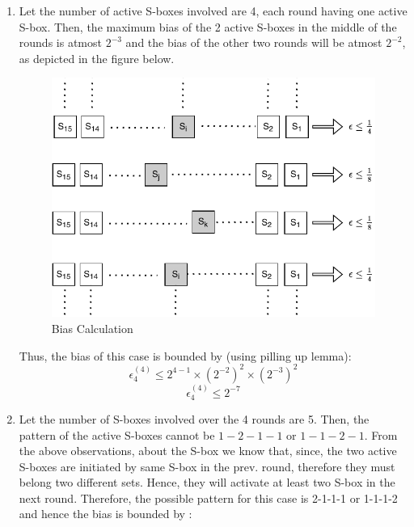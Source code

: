 \documentclass[preprint]{transcrypto}
\begin{document}
\begin{enumerate}
    \item Let the number of active S-boxes involved are 4, each round having one active S-box. Then, the maximum bias of the 2 active S-boxes in the middle of the rounds is atmost $2^{-3}$ and the bias of the other two rounds will be atmost $2^{-2}$, as depicted in the figure below.
    \begin{figure}[H]
        \centering
        \includegraphics[width=\linewidth]{LC.pdf}
        \endminipage
        \caption{Bias Calculation}
    \end{figure}
    Thus, the bias of this case is bounded by (using pilling up lemma): 
    \begin{equation*}
        \epsilon_4^{(4)} \leq 2^{4-1} \times (2^{-2})^2 \times (2^{-3})^2
    \end{equation*}
    \begin{equation*}
        \epsilon_4^{(4)} \leq 2^{-7} 
    \end{equation*}
    \item Let the number of S-boxes involved over the 4 rounds are 5. Then, the pattern of the active S-boxes cannot be $1-2-1-1$ or $1-1-2-1$. From the above observations, about the S-box we know that, since, the two active S-boxes are initiated by same S-box in the prev. round, therefore they must belong two different sets. Hence, they will activate at least two S-box in the next round. Therefore, the possible pattern for this case is 2-1-1-1 or 1-1-1-2 and hence the bias is bounded by : 
    \begin{equation*}

\end{equation*}
\end{enumerate}
\end{document}
